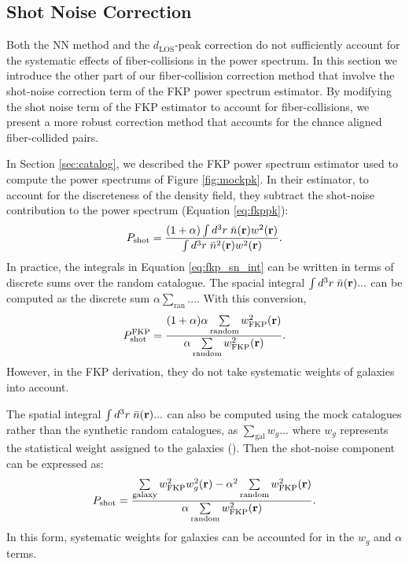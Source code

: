 \documentclass{emulateapj}
\begin{document}
\subsection{Shot Noise Correction} \label{sec:shotnoise} 
Both the NN method and the $d_\mathrm{LOS}$-peak correction do not sufficiently account for the systematic effects of fiber-collisions in the power spectrum. In this section we introduce the other part of our fiber-collision correction method that involve the shot-noise correction term of the FKP power spectrum estimator. By modifying the shot noise term of the FKP estimator to account for fiber-collisions, we present a more robust correction method that accounts for the chance aligned fiber-collided pairs. 

In Section \ref{sec:catalog}, we described the FKP power spectrum estimator used to compute the power spectrums of Figure \ref{fig:mockpk}. In their estimator, to account for the discreteness of the density field, they subtract the shot-noise contribution to the power spectrum (Equation \ref{eq:fkppk}): 
\begin{equation} \label{eq:fkp_sn_int}
P_\mathrm{shot} = \frac{ (1+\alpha) \int d^3r \;\bar{n}({\bf r})w^2({\bf r})}{\int d^3r \;\bar{n}^2({\bf r})w^2({\bf r})}. 
\end{equation}
In practice, the integrals in Equation \ref{eq:fkp_sn_int} can be written in terms of discrete sums over the random catalogue. The spacial integral $\int d^3r \; \bar{n}({\bf r}) ...$ can be computed as the discrete sum $\alpha \sum_{\mathrm{ran}}...$. With this conversion,
\begin{equation} \label{eq:fkp_shotnoise}
P^\mathrm{FKP}_\mathrm{shot} = \frac{(1+\alpha) \alpha \sum\limits_{\mathrm{random}} w_\mathrm{FKP}^2({\bf r})}{\alpha \sum\limits_{\mathrm{random}}w_\mathrm{FKP}^2({\bf r})}.
\end{equation} 
However, in the FKP derivation, they do not take systematic weights of galaxies into account.

The spatial integral $\int d^3r \;\bar{n}({\bf r})...$ can also be computed using the mock catalogues rather than the synthetic random catalogues, as $\sum_{\mathrm{gal}} w_g...$ where $w_g$ represents the statistical weight assigned to the galaxies (\citealt{Cole:2005aa, Yamamoto:2006aa, Beutler:2014aa, Gil-Marin:2014aa}). Then the shot-noise component can be expressed as: 
\begin{equation} \label{eq:fkpweight}
P_\mathrm{shot} = \frac{ \sum\limits_{\mathrm{galaxy}} w^2_\mathrm{FKP}w^2_g({\bf r})- \alpha^2 \sum\limits_{\mathrm{random}} w_\mathrm{FKP}^2({\bf r})}{\alpha \sum\limits_{\mathrm{random}}w_\mathrm{FKP}^2({\bf r})}.
\end{equation}
In this form, systematic weights for galaxies can be accounted for in the $w_g$ and $\alpha$ terms. 
\end{document}
